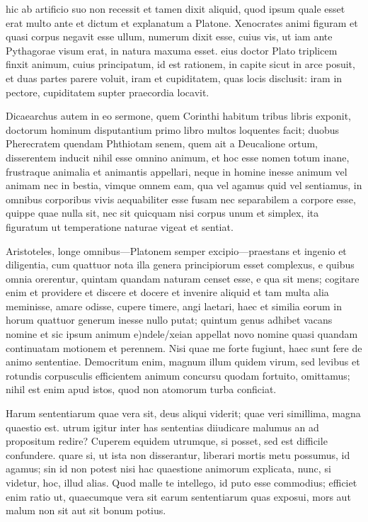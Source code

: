  hic ab artificio suo non recessit et tamen dixit aliquid, quod ipsum quale esset erat multo ante et dictum et explanatum a Platone. Xenocrates animi figuram et quasi corpus negavit esse ullum, numerum dixit esse, cuius vis, ut iam ante Pythagorae visum erat, in natura maxuma esset. eius doctor Plato triplicem finxit animum, cuius principatum, id est rationem, in capite sicut in arce posuit, et duas partes parere voluit, iram et cupiditatem, quas locis disclusit: iram in pectore, cupiditatem supter praecordia locavit.

 Dicaearchus autem in eo sermone, quem Corinthi habitum tribus libris exponit, doctorum hominum disputantium primo libro multos loquentes facit; duobus Pherecratem quendam Phthiotam senem, quem ait a Deucalione ortum, disserentem inducit nihil esse omnino animum, et hoc esse nomen totum inane, frustraque animalia et animantis appellari, neque in homine inesse animum vel animam nec in bestia, vimque omnem eam, qua vel agamus quid vel sentiamus, in omnibus corporibus vivis aequabiliter esse fusam nec separabilem a corpore esse, quippe quae nulla sit, nec sit quicquam nisi corpus unum et simplex, ita figuratum ut temperatione naturae vigeat et sentiat.

 Aristoteles, longe omnibus—Platonem semper excipio—praestans et ingenio et diligentia, cum quattuor nota illa genera principiorum esset complexus, e quibus omnia orerentur, quintam quandam naturam censet esse, e qua sit mens; cogitare enim et providere et discere et docere et invenire aliquid et tam multa alia meminisse, amare odisse, cupere timere, angi laetari, haec et similia eorum in horum quattuor generum inesse nullo putat; quintum genus adhibet vacans nomine et sic ipsum animum e)ndele/xeian appellat novo nomine quasi quandam continuatam motionem et perennem. Nisi quae me forte fugiunt, haec sunt fere de animo sententiae. Democritum enim, magnum illum quidem virum, sed levibus et rotundis corpusculis efficientem animum concursu quodam fortuito, omittamus; nihil est enim apud istos, quod non atomorum turba conficiat.

 Harum sententiarum quae vera sit, deus aliqui viderit; quae veri simillima, magna quaestio est. utrum igitur inter has sententias diiudicare malumus an ad propositum redire? Cuperem equidem utrumque, si posset, sed est difficile confundere. quare si, ut ista non disserantur, liberari mortis metu possumus, id agamus; sin id non potest nisi hac quaestione animorum explicata, nunc, si videtur, hoc, illud alias. Quod malle te intellego, id puto esse commodius; efficiet enim ratio ut, quaecumque vera sit earum sententiarum quas exposui, mors aut malum non sit aut sit bonum potius.

